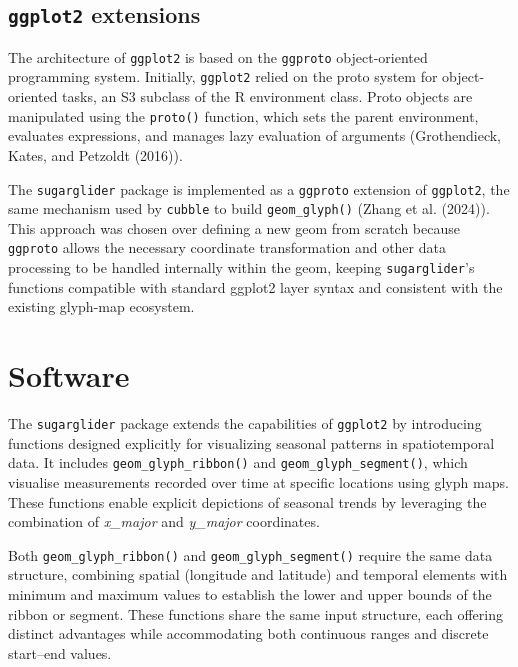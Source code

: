 \hypertarget{ggplot2-extensions}{%
\subsection{\texorpdfstring{\texttt{ggplot2} extensions}{ggplot2 extensions}}\label{ggplot2-extensions}}

The architecture of \texttt{ggplot2} is based on the \texttt{ggproto} object-oriented programming system. Initially, \texttt{ggplot2} relied on the proto system for object-oriented tasks, an S3 subclass of the R environment class. Proto objects are manipulated using the \texttt{proto()} function, which sets the parent environment, evaluates expressions, and manages lazy evaluation of arguments (Grothendieck, Kates, and Petzoldt (2016)).

The \texttt{sugarglider} package is implemented as a \texttt{ggproto} extension of \texttt{ggplot2}, the same mechanism used by \texttt{cubble} to build \texttt{geom\_glyph()} (Zhang et al. (2024)). This approach was chosen over defining a new geom from scratch because \texttt{ggproto} allows the necessary coordinate transformation and other data processing to be handled internally within the geom, keeping \texttt{sugarglider}'s functions compatible with standard ggplot2 layer syntax and consistent with the existing glyph-map ecosystem.

\hypertarget{software}{%
\section{Software}\label{software}}

The \texttt{sugarglider} package extends the capabilities of \texttt{ggplot2} by introducing functions designed explicitly for visualizing seasonal patterns in spatiotemporal data. It includes \texttt{geom\_glyph\_ribbon()} and \texttt{geom\_glyph\_segment()}, which visualise measurements recorded over time at specific locations using glyph maps. These functions enable explicit depictions of seasonal trends by leveraging the combination of \emph{x\_major} and \emph{y\_major} coordinates.

Both \texttt{geom\_glyph\_ribbon()} and \texttt{geom\_glyph\_segment()} require the same data structure, combining spatial (longitude and latitude) and temporal elements with minimum and maximum values to establish the lower and upper bounds of the ribbon or segment. These functions share the same input structure, each offering distinct advantages while accommodating both continuous ranges and discrete start--end values.

